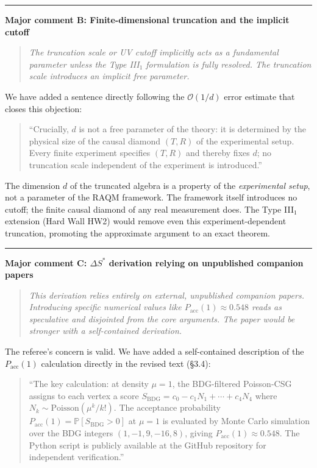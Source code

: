 \documentclass[11pt]{article}
\newcommand{\refereequote}[1]{%
  \begin{quote}\itshape\small #1\end{quote}}
\begin{document}
\bigskip\hrule\bigskip

\noindent\textbf{Major comment B: Finite-dimensional truncation and the
implicit cutoff}

\refereequote{The truncation scale or UV cutoff implicitly acts as a
fundamental parameter unless the Type III$_1$ formulation is fully
resolved. The truncation scale introduces an implicit free parameter.}

We have added a sentence directly following the $\mathcal{O}(1/d)$ error
estimate that closes this objection:

\begin{quote}
``Crucially, $d$ is not a free parameter of the theory: it is determined
by the physical size of the causal diamond $(T, R)$ of the experimental
setup. Every finite experiment specifies $(T, R)$ and thereby fixes $d$;
no truncation scale independent of the experiment is introduced.''
\end{quote}

The dimension $d$ of the truncated algebra is a property of the
\emph{experimental setup}, not a parameter of the RAQM framework.
The framework itself introduces no cutoff; the finite causal diamond of any
real measurement does. The Type III$_1$ extension (Hard Wall HW2) would
remove even this experiment-dependent truncation, promoting the approximate
argument to an exact theorem.

\bigskip\hrule\bigskip

\noindent\textbf{Major comment C: $\Delta S^*$ derivation relying on
unpublished companion papers}

\refereequote{This derivation relies entirely on external, unpublished
companion papers. Introducing specific numerical values like
$P_{\mathrm{acc}}(1) \approx 0.548$ reads as speculative and disjointed
from the core arguments. The paper would be stronger with a self-contained
derivation.}

The referee's concern is valid. We have added a self-contained description
of the $P_{\mathrm{acc}}(1)$ calculation directly in the revised text
(\S3.4):

\begin{quote}
``The key calculation: at density $\mu = 1$, the BDG-filtered Poisson-CSG
assigns to each vertex a score $S_{\mathrm{BDG}} = c_0 - c_1 N_1 + \cdots
+ c_4 N_4$ where $N_k \sim \mathrm{Poisson}(\mu^k/k!)$. The acceptance
probability $P_{\mathrm{acc}}(1) = \mathbb{P}[S_{\mathrm{BDG}} > 0]$ at
$\mu=1$ is evaluated by Monte Carlo simulation over the BDG integers
$(1,-1,9,-16,8)$, giving $P_{\mathrm{acc}}(1) \approx 0.548$. The Python
script is publicly available at the GitHub repository for independent
verification.''
\end{quote}
\end{document}
